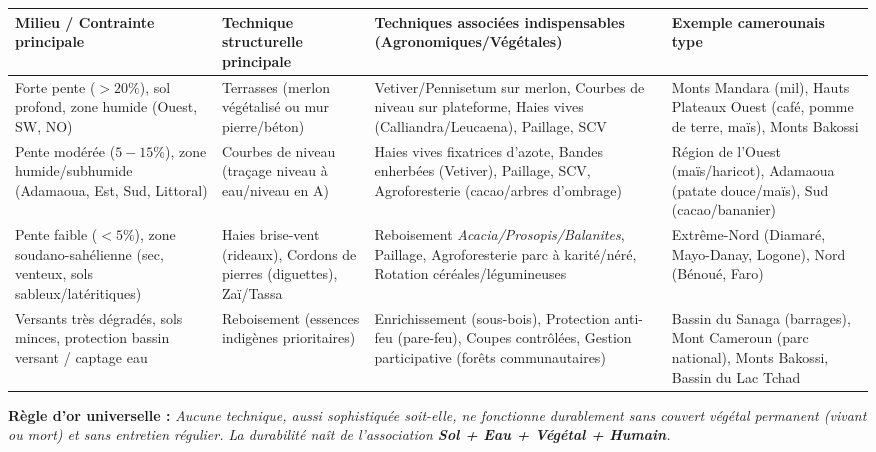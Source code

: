 \documentclass[11pt]{article}
\begin{document}
\begin{aretenir}
\begin{center}
\begin{tabularx}{\linewidth}{|l|X|X|X|}\hline
\textbf{Milieu / Contrainte principale} & \textbf{Technique structurelle principale} & \textbf{Techniques associées indispensables (Agronomiques/Végétales)} & \textbf{Exemple camerounais type} \\ \hline
Forte pente ($>20\%$), sol profond, zone humide (Ouest, SW, NO) & Terrasses (merlon végétalisé ou mur pierre/béton) & Vetiver/Pennisetum sur merlon, Courbes de niveau sur plateforme, Haies vives (Calliandra/Leucaena), Paillage, SCV & Monts Mandara (mil), Hauts Plateaux Ouest (café, pomme de terre, maïs), Monts Bakossi \\ \hline
Pente modérée ($5-15\%$), zone humide/subhumide (Adamaoua, Est, Sud, Littoral) & Courbes de niveau (traçage niveau à eau/niveau en A) & Haies vives fixatrices d'azote, Bandes enherbées (Vetiver), Paillage, SCV, Agroforesterie (cacao/arbres d'ombrage) & Région de l'Ouest (maïs/haricot), Adamaoua (patate douce/maïs), Sud (cacao/bananier) \\ \hline
Pente faible ($<5\%$), zone soudano-sahélienne (sec, venteux, sols sableux/latéritiques) & Haies brise-vent (rideaux), Cordons de pierres (diguettes), Zaï/Tassa & Reboisement \emph{Acacia/Prosopis/Balanites}, Paillage, Agroforesterie parc à karité/néré, Rotation céréales/légumineuses & Extrême-Nord (Diamaré, Mayo-Danay, Logone), Nord (Bénoué, Faro) \\ \hline
Versants très dégradés, sols minces, protection bassin versant / captage eau & Reboisement (essences indigènes prioritaires) & Enrichissement (sous-bois), Protection anti-feu (pare-feu), Coupes contrôlées, Gestion participative (forêts communautaires) & Bassin du Sanaga (barrages), Mont Cameroun (parc national), Monts Bakossi, Bassin du Lac Tchad \\ \hline
\end{tabularx}
\end{center}
\textbf{Règle d'or universelle :} \emph{Aucune technique, aussi sophistiquée soit-elle, ne fonctionne durablement sans couvert végétal permanent (vivant ou mort) et sans entretien régulier. La durabilité naît de l'association \textbf{Sol + Eau + Végétal + Humain}.}
\end{aretenir}
\end{document}
